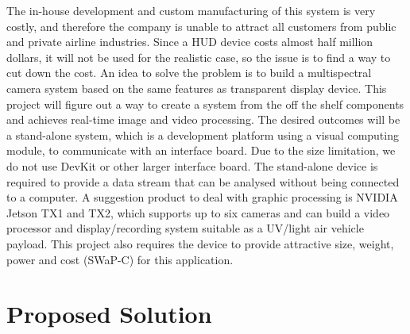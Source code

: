 \documentclass[letterpaper,10pt,serif,draftclsnofoot,onecolumn,compsoc,titlepage]{IEEEtran}
\begin{document}
The in-house development and custom manufacturing of this system is very costly, and 
therefore the company is unable to attract all customers from public and private 
airline industries. Since a HUD device costs almost half million dollars, it will not 
be used for the realistic case, so the issue is to find a way to cut down the cost.  
An idea to solve the problem is to build a multispectral camera system based on the 
same features as transparent display device. This project will figure out a way to 
create a system from the off the shelf components and achieves real-time image and 
video processing. The desired outcomes will be a stand-alone system, which is a 
development platform using a visual computing module, to communicate with an interface 
board. Due to the size limitation, we do not use DevKit or other larger interface 
board. The stand-alone device is required to provide a data stream that can be 
analysed without being connected to a computer. A suggestion product to deal with 
graphic processing is NVIDIA Jetson TX1 and TX2, which supports up to six cameras 
and can build a video processor and display/recording system suitable as a UV/light 
air vehicle payload. This project also requires the device to provide attractive size, 
weight, power and cost (SWaP-C) for this application. \\
 
\section{Proposed Solution}
\end{document}
